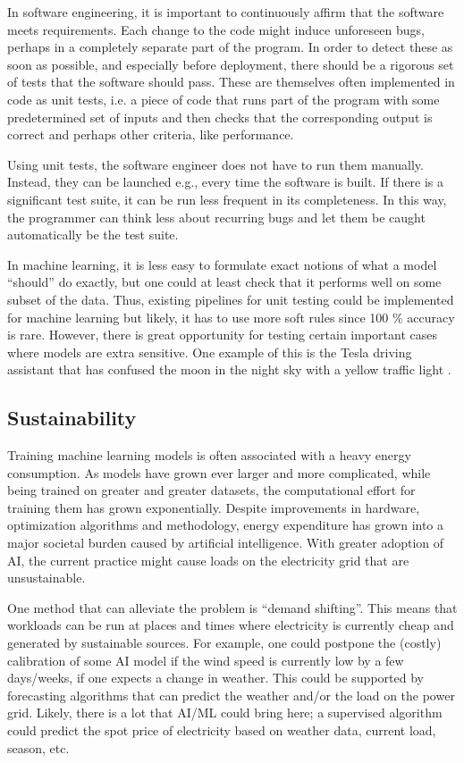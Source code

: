 \documentclass{article}
\begin{document}
In software engineering, it is important to continuously affirm that the software meets requirements.
Each change to the code might induce unforeseen bugs, perhaps in a completely separate part of the program.
In order to detect these as soon as possible, and especially before deployment, there should be a rigorous set of tests that the software should pass.
These are themselves often implemented in code as unit tests, i.e. a piece of code that runs part of the program with some predetermined set of inputs and then checks that the corresponding output is correct and perhaps other criteria, like performance.

Using unit tests, the software engineer does not have to run them manually.
Instead, they can be launched e.g., every time the software is built.
If there is a significant test suite, it can be run less frequent in its completeness.
In this way, the programmer can think less about recurring bugs and let them be caught automatically be the test suite.

In machine learning, it is less easy to formulate exact notions of what a model ``should'' do exactly, but one could at least check that it performs well on some subset of the data.
Thus, existing pipelines for unit testing could be implemented for machine learning but likely, it has to use more soft rules since 100 \% accuracy is rare.
However, there is great opportunity for testing certain important cases where models are extra sensitive.
One example of this is the Tesla driving assistant that has confused the moon in the night sky with a yellow traffic light \cite{Ramey2021Jul}.

\subsection{Sustainability}

Training machine learning models is often associated with a heavy energy consumption.
As models have grown ever larger and more complicated, while being trained on greater and greater datasets, the computational effort for training them has grown exponentially.
Despite improvements in hardware, optimization algorithms and methodology, energy expenditure has grown into a major societal burden caused by artificial intelligence.
With greater adoption of AI, the current practice might cause loads on the electricity grid that are unsustainable.

One method that can alleviate the problem is ``demand shifting''.
This means that workloads can be run at places and times where electricity is currently cheap and generated by sustainable sources.
For example, one could postpone the (costly) calibration of some AI model if the wind speed is currently low by a few days/weeks, if one expects a change in weather.
This could be supported by forecasting algorithms that can predict the weather and/or the load on the power grid.
Likely, there is a lot that AI/ML could bring here; a supervised algorithm could predict the spot price of electricity based on weather data, current load, season, etc.
\end{document}

